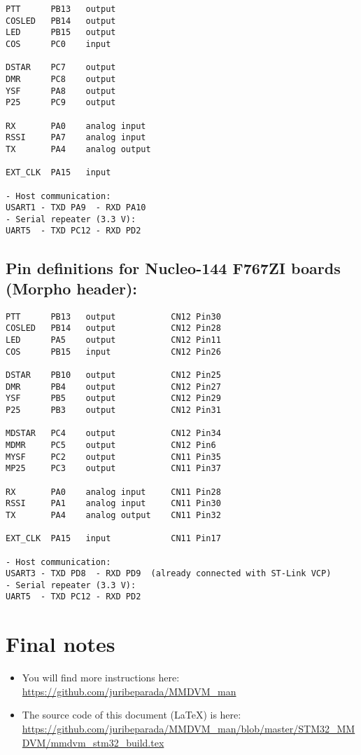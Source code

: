 \documentclass[]{article}
\begin{document}
\begin{verbatim}
PTT      PB13   output
COSLED   PB14   output
LED      PB15   output
COS      PC0    input

DSTAR    PC7    output
DMR      PC8    output
YSF      PA8    output
P25      PC9    output

RX       PA0    analog input
RSSI     PA7    analog input
TX       PA4    analog output

EXT_CLK  PA15   input

- Host communication:
USART1 - TXD PA9  - RXD PA10
- Serial repeater (3.3 V):
UART5  - TXD PC12 - RXD PD2
\end{verbatim}

\subsection{Pin definitions for Nucleo-144 F767ZI boards (Morpho header):}

\begin{verbatim}
PTT      PB13   output           CN12 Pin30
COSLED   PB14   output           CN12 Pin28
LED      PA5    output           CN12 Pin11
COS      PB15   input            CN12 Pin26

DSTAR    PB10   output           CN12 Pin25
DMR      PB4    output           CN12 Pin27
YSF      PB5    output           CN12 Pin29
P25      PB3    output           CN12 Pin31

MDSTAR   PC4    output           CN12 Pin34
MDMR     PC5    output           CN12 Pin6
MYSF     PC2    output           CN11 Pin35
MP25     PC3    output           CN11 Pin37

RX       PA0    analog input     CN11 Pin28
RSSI     PA1    analog input     CN11 Pin30
TX       PA4    analog output    CN11 Pin32

EXT_CLK  PA15   input            CN11 Pin17

- Host communication:
USART3 - TXD PD8  - RXD PD9  (already connected with ST-Link VCP)
- Serial repeater (3.3 V):
UART5  - TXD PC12 - RXD PD2
\end{verbatim}

\section{Final notes}

\begin{itemize}[leftmargin=*]
	
\item You will find more instructions here: \url{https://github.com/juribeparada/MMDVM_man}

\item The source code of this document (LaTeX) is here: \url{https://github.com/juribeparada/MMDVM_man/blob/master/STM32_MMDVM/mmdvm_stm32_build.tex}

\end{itemize}
\end{document}
